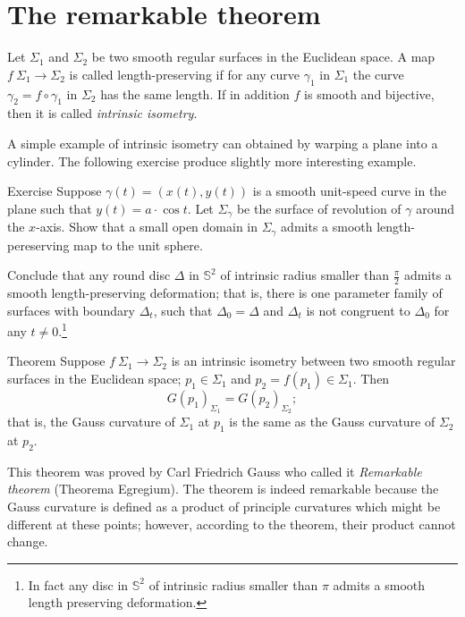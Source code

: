 \section*{The remarkable theorem}

Let $\Sigma_1$ and $\Sigma_2$ be two smooth regular surfaces in the Euclidean space.
A map $f\:\Sigma_1\to \Sigma_2$ is called  length-preserving if for any curve $\gamma_1$ in $\Sigma_1$ the curve $\gamma_2=f\circ\gamma_1$ in $\Sigma_2$ has the same length. %
If in addition $f$ is smooth and bijective, then it is called \emph{intrinsic isometry}. 

A simple example of intrinsic isometry can obtained by warping a plane into a cylinder.
The following exercise produce slightly more interesting example.

\begin{thm}{Exercise}\label{ex:deformation}
Suppose $\gamma(t)=(x(t),y(t))$ is a smooth unit-speed curve in the plane such that $y(t)=a\cdot \cos t$.
Let $\Sigma_\gamma$ be the surface of revolution of $\gamma$ around the $x$-axis.
Show that a small open domain in $\Sigma_\gamma$ admits a smooth length-pereserving map to the unit sphere.

Conclude that any round disc $\Delta$ in $\mathbb{S}^2$ of intrinsic radius smaller than $\tfrac\pi2$ admits a smooth length-preserving deformation; that is, there is one parameter family of surfaces with boundary $\Delta_t$, such that $\Delta_0=\Delta$ and $\Delta_t$ is not congruent to $\Delta_0$ for any $t\ne0$.\footnote{In fact any disc in $\mathbb{S}^2$ of intrinsic radius smaller than $\pi$ admits a smooth length preserving deformation. %
}
\end{thm}


\begin{thm}{Theorem}\label{thm:remarkable}
Suppose $f\:\Sigma_1\to \Sigma_2$ is an intrinsic isometry between two smooth regular surfaces in  the Euclidean space; $p_1\in \Sigma_1$ and $p_2=f(p_1)\in \Sigma_1$.
Then 
\[G(p_1)_{\Sigma_1}=G(p_2)_{\Sigma_2};\]
that is, the Gauss curvature of $\Sigma_1$ at $p_1$ is the same as the Gauss curvature of $\Sigma_2$ at $p_2$.
\end{thm}

This theorem was proved by Carl Friedrich Gauss \cite{gauss} who called it \emph{Remarkable theorem} (Theorema Egregium).
The theorem is indeed remarkable because the Gauss curvature is defined as a product of principle curvatures which might be different at these points; however, according to the theorem, their product cannot change.

